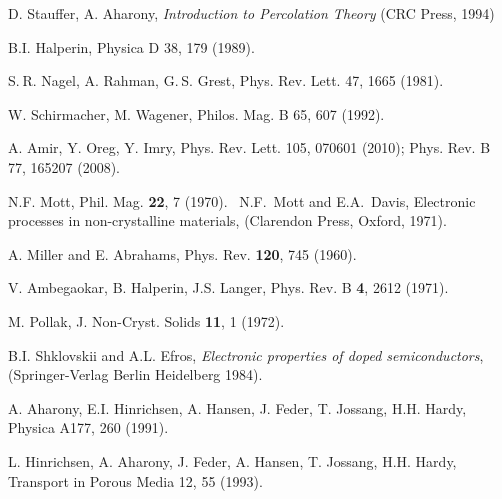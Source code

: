 \documentclass[aps,prb,floats,floatfix,twocolumn]{revtex4}
\begin{document}
\begin{thebibliography}{99}



D. Stauffer, A. Aharony, 
{\em Introduction to Percolation Theory}
(CRC Press, 1994) 



B.I. Halperin, Physica D 38,  179 (1989).




S. R. Nagel, A. Rahman, G. S. Grest, 
Phys. Rev. Lett. 47, 1665 (1981).

W. Schirmacher, M. Wagener, 
Philos. Mag. B 65, 607 (1992).


A. Amir, Y. Oreg, Y. Imry,
Phys. Rev. Lett. 105, 070601 (2010); 
%
Phys. Rev. B 77, 165207 (2008).



N.F. Mott, Phil. Mag. {\bf 22}, 7 (1970). 
\ N.F.~Mott and E.A.~Davis, 
Electronic processes in non-crystalline materials, 
(Clarendon Press, Oxford, 1971). 

A. Miller and E. Abrahams, Phys. Rev. {\bf 120}, 745 (1960).

V. Ambegaokar, B. Halperin, J.S. Langer, 
Phys. Rev. B {\bf 4}, 2612 (1971). 


M. Pollak, J. Non-Cryst. Solids {\bf 11}, 1 (1972).

B.I. Shklovskii and A.L. Efros, 
{\em Electronic properties of doped semiconductors},
(Springer-Verlag Berlin Heidelberg 1984).




A. Aharony, E.I. Hinrichsen, A. Hansen, J. Feder, T. Jossang, H.H. Hardy,  
Physica A177, 260 (1991). 

L. Hinrichsen, A. Aharony, J. Feder, A. Hansen, T. Jossang, H.H. Hardy, 
Transport in Porous Media 12, 55 (1993). 




\end{thebibliography}
\end{document}

